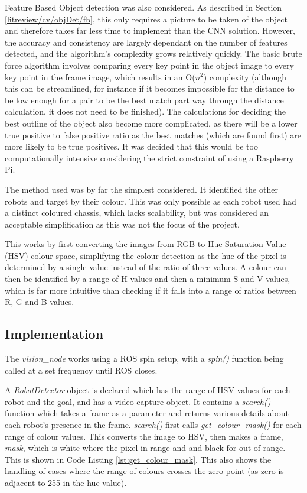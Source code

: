 Feature Based Object detection was also considered. As described in Section \ref{litreview/cv/objDet/fb}, this only requires a picture to be taken of the object and therefore takes far less time to
implement than the CNN solution. However, the accuracy and
consistency are largely dependant on the number of features
detected, and the algorithm's complexity grows relatively
quickly. The basic brute force algorithm involves comparing
every key point in the object image to every key point in the
frame image, which results in an O($n^2$) complexity (although
this can be streamlined, for instance if it becomes impossible
for the distance to be low enough for a pair to be the best
match part way through the distance calculation, it does not
need to be finished). The calculations for deciding the best
outline of the object also become more complicated, as there
will be a lower true positive to false positive ratio as the
best matches (which are found first) are more likely to be
true positives. It was decided that this would be too
computationally intensive considering the strict constraint of
using a Raspberry Pi.

The method used was by far the simplest considered. It identified the other robots and target 
by their colour. This was only possible as each robot used had a distinct coloured chassis, 
which lacks scalability, but was considered an acceptable simplification as this was not the 
focus of the project.

This works by first converting the images from RGB to Hue-Saturation-Value (HSV) colour space, 
simplifying the colour detection as the hue of the pixel is determined by a single value 
instead of the ratio of three values. A colour can then be identified by a range of H values 
and then a minimum S and V values, which is far more intuitive than checking if it falls into a 
range of ratios between R, G and B values.

\subsection{Implementation}\label{soft/cv/impl}
The \textit{vision\_node} works using a ROS spin setup, with a \textit{spin()} function being 
called at a set frequency until ROS closes.

A \textit{RobotDetector} object is declared which has the range of HSV values for each robot 
and the goal, and has a video capture object. It contains a \textit{search()} function which 
takes a frame as a parameter and returns various details about each robot's presence in the 
frame. \textit{search()} first calls \textit{get\_colour\_mask()} for each range of colour 
values. This converts the image to HSV, then makes a frame, \textit{mask}, which is white where 
the pixel in range and and black for out of range. This is shown in Code Listing 
\ref{lst:get_colour_mask}. This also shows the handling of cases where the range of colours 
crosses the zero point (as zero is adjacent to 255 in the hue value).

